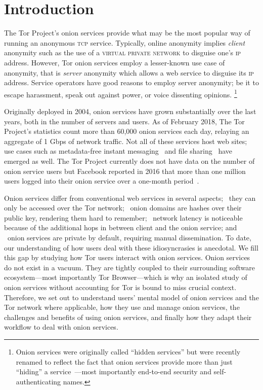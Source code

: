 \section{Introduction}
\label{sec:introduction}
The Tor Project's onion services provide what may be the
most popular way of running an anonymous \textsc{tcp} service. Typically, online anonymity implies \emph{client} anonymity
such as the use of a \textsc{virtual private network} to disguise one's \textsc{ip} address.  However, Tor onion services employ a lesser-known use case of anonymity, that is \emph{server} anonymity which allows a web service to
disguise its \textsc{ip} address.  Service operators have good reasons to employ
server anonymity; be it to escape harassment, speak out against power, or voice
dissenting opinions.  \footnote{Onion
services were originally called ``hidden services'' but were recently renamed to
reflect the fact that onion services provide more than just ``hiding'' a
service~\cite{Johnson2015a}---most importantly end-to-end security and
self-authenticating names.}

Originally deployed in 2004, onion services have grown substantially over the
last years, both in the number of servers and users.  As of February 2018, The
Tor Project's statistics count more than 60,000 onion services each day,
relaying an aggregate of 1 Gbps of network traffic.  Not all of these services
host web sites; use cases such as metadata-free instant
messaging~\cite{ricochet} and file sharing~\cite{onionshare} have emerged as
well.  The Tor Project currently does not have data on the number of onion
service users but Facebook reported in 2016 that more than one million users
logged into their onion service over a one-month period~\cite{facebook-users}.

Onion services differ from conventional web services in several aspects;
\first~they can only be accessed over the Tor network; \second~onion domains are
hashes over their public key, rendering them hard to remember; \third~network
latency is noticeable because of the additional hops in between client and the
onion service; and \fourth~onion services are private by default, requiring
manual dissemination.  To date, our understanding of how users deal with these
idiosyncrasies is anecdotal.  We fill this gap by studying how Tor users
interact with onion services. Onion services do not exist in a vacuum.  They are tightly coupled to their
surrounding software ecosystem---most importantly Tor Browser---which is why an
isolated study of onion services without accounting for Tor is bound to miss crucial context.  Therefore, we set out to understand users'
mental model of onion services and the Tor network where applicable, how they use and manage onion services, the challenges and benefits of using onion services, and finally how they adapt their workflow to deal with onion services.

